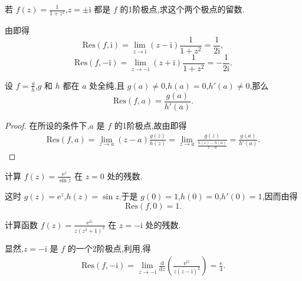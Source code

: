 \documentclass[../../main.tex]{subfiles}%
\begin{document}
\begin{example}
若 \( f(z) = \frac{1}{1 + z^2} \),\( z = \pm \mathrm{i} \) 都是 \( f \) 的1阶极点,求这个两个极点的留数.
\end{example}
\begin{solution}
由即得
\[
\mathrm{Res}(f,\mathrm{i}) = \lim_{z \to \mathrm{i}} (z - \mathrm{i}) \frac{1}{1 + z^2} = \frac{1}{2\mathrm{i}},
\]
\[
\mathrm{Res}(f, -\mathrm{i}) = \lim_{z \to -\mathrm{i}} (z + \mathrm{i}) \frac{1}{1 + z^2} = -\frac{1}{2\mathrm{i}}.
\]

\end{solution}

\begin{proposition}\label{proposition:命题5.4.5}
设 \( f = \frac{g}{h} \),\( g \) 和 \( h \) 都在 \( a \) 处全纯,且 \( g(a) \neq 0 \),\( h(a) = 0 \),\( h'(a) \neq 0 \),那么
\[
\mathrm{Res}(f,a) = \frac{g(a)}{h'(a)}.
\]
\end{proposition}
\begin{proof}
在所设的条件下,\( a \) 是 \( f \) 的1阶极点,故由即得
\begin{align*}
\mathrm{Res}(f,a) = \lim_{z \to a} (z - a) \frac{g(z)}{h(z)} = \lim_{z \to a} \frac{g(z)}{\frac{h(z) - h(a)}{z - a}} = \frac{g(a)}{h'(a)}.
\end{align*}
\end{proof}

\begin{example}
计算 \( f(z) = \frac{\mathrm{e}^z}{\sin z} \) 在 \( z = 0 \) 处的残数.
\end{example}
\begin{solution}
这时 \( g(z) = \mathrm{e}^z \),\( h(z) = \sin z \).于是 \( g(0) = 1 \),\( h(0) = 0 \),\( h'(0) = 1 \),因而由得
\[
\mathrm{Res}(f,0) = 1.
\]

\end{solution}

\begin{example}
计算函数 \( f(z) = \frac{\mathrm{e}^{\mathrm{i}z}}{z(z^2 + 1)^2} \) 在 \( z = -\mathrm{i} \) 处的残数.
\end{example}
\begin{solution}
显然,\( z = -\mathrm{i} \) 是 \( f \) 的一个2阶极点,利用,得
\begin{align*}
\mathrm{Res}(f, -\mathrm{i}) = \lim_{z \to -\mathrm{i}} \frac{\mathrm{d}}{\mathrm{d}z} \left( \frac{\mathrm{e}^{\mathrm{i}z}}{z(z - \mathrm{i})^2} \right) = \frac{\mathrm{e}}{4}.
\end{align*}

\end{solution}
\end{document}
